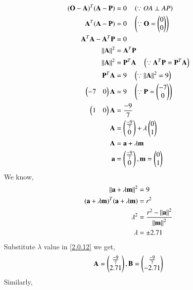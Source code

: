 \documentclass[journal,12pt,twocolumn]{IEEEtran}
\begin{document}
\begin{align}
(\mathbf{O}-\mathbf{A})^T (\mathbf{A}-\mathbf{P}) &= 0 \quad \left(\because OA \perp AP \right)
\\
\mathbf{A}^T(\mathbf{A}-\mathbf{P}) &= 0 \quad \left(\because \mathbf{O}=\begin{pmatrix}0\\0\end{pmatrix}\right)
\\
\mathbf{A}^T \mathbf{A} - \mathbf{A}^T \mathbf{P} &= 0  
\\
\left\lVert\mathbf{A}\right\rVert^2 &= \mathbf{A}^T \mathbf{P}
\\
\left\lVert\mathbf{A}\right\rVert^2 &= \mathbf{P}^T \mathbf{A}  \quad \left(\because \mathbf{A}^T \mathbf{P} = \mathbf{P}^T \mathbf{A}\right)
\\
\mathbf{P}^T \mathbf{A} &= 9 \quad \left(\because \left\lVert\mathbf{A}\right\rVert^2 = 9\right)
\\
\begin{pmatrix}-7&0\end{pmatrix} \mathbf{A} &= 9 \quad \left(\because \mathbf{P} = \begin{pmatrix}-7\\0\end{pmatrix} \right)
\\
\begin{pmatrix}1&0\end{pmatrix} \mathbf{A} &= \frac{-9}{7}
\\
\mathbf{A} &= \begin{pmatrix}\frac{-9}{7}\\0\end{pmatrix} + \lambda \begin{pmatrix}0\\1\end{pmatrix} \label{2.0.12} 
\\
\mathbf{A}&=\mathbf{a}+\lambda\mathbf{m} 
\\
\mathbf{a}&=\begin{pmatrix}\frac{-9}{7}\\ 0\end{pmatrix},\mathbf{m}=\begin{pmatrix}0\\1\end{pmatrix}
\end{align}
 We know,
\begin{align}
\left\lVert\mathbf{a}+\lambda\mathbf{m}\right\rVert^2&=9
\\
(\mathbf{a}+\lambda \mathbf{m})^T(\mathbf{a}+\lambda \mathbf{m})&=r^2
\\
\lambda^2&=\frac{r^2-\left\lVert\mathbf{a}\right\rVert^2}{\left\lVert\mathbf{m}\right\rVert^2}
\\
\lambda &= \pm2.71
\end{align}
Substitute $\lambda$  value in \eqref{2.0.12} we get,
\begin{align}
\mathbf{A}=\begin{pmatrix}\frac{-9}{7}\\2.71\end{pmatrix},
\mathbf{B}=\begin{pmatrix}\frac{-9}{7}\\-2.71\end{pmatrix}
\end{align}
Similarly,
\end{document}
